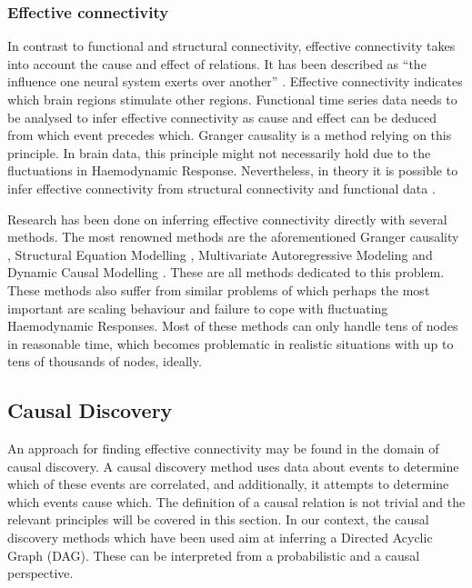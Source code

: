\documentclass[a4paper, 10pt, english, onecolumn]{article}
\begin{document}
\subsubsection{Effective connectivity}
In contrast to functional and structural connectivity, effective connectivity takes into account the cause and effect of relations.
It has been described as ``the influence one neural system exerts over another'' \cite{friston1994}.
Effective connectivity indicates which brain regions stimulate other regions.
Functional time series data needs to be analysed to infer effective connectivity as cause and effect can be deduced from which event precedes which.
Granger causality is a method relying on this principle.
In brain data, this principle might not necessarily hold due to the fluctuations in Haemodynamic Response.
Nevertheless, in theory it is possible to infer effective connectivity from structural connectivity and functional data \cite{mclntosh1994, harrison2003, friston2003, roebroeck2005}.

Research has been done on inferring effective connectivity directly with several methods.
The most renowned methods are the aforementioned Granger causality \cite{roebroeck2005}, Structural Equation Modelling \cite{mclntosh1994}, Multivariate Autoregressive Modeling \cite{harrison2003} and Dynamic Causal Modelling \cite{friston2003}.
These are all methods dedicated to this problem.
These methods also suffer from similar problems of which perhaps the most important are scaling behaviour and failure to cope with fluctuating Haemodynamic Responses.
Most of these methods can only handle tens of nodes in reasonable time, which becomes problematic in realistic situations with up to tens of thousands of nodes, ideally.

\subsection{Causal Discovery}
An approach for finding effective connectivity may be found in the domain of causal discovery.
A causal discovery method uses data about events to determine which of these events are correlated, and additionally, it attempts to determine which events cause which.
The definition of a causal relation is not trivial \cite[p.20]{spirtes2000} and the relevant principles will be covered in this section.
In our context, the causal discovery methods which have been used aim at inferring a Directed Acyclic Graph (DAG).
These can be interpreted from a probabilistic and a causal perspective.
\end{document}
